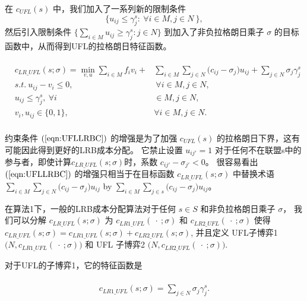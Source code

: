 \documentclass[UTF8]{article}
\begin{document}
\begin{定义}
      在 $c_{UFL}(s)$ 中，我们加入了一系列新的限制条件
      \begin{equation}\label{eqn:UFLLRBC}
      \big\{ u_{ij} \leq \gamma_j^s: ~\forall i \in M, j \in N\ \big\},
      \end{equation}
      然后引入限制条件 $\{ \sum_{i \in M} u_{ij} \geq \gamma_j^s:j \in N \}$ 到加入了非负拉格朗日乘子 $\sigma$ 的目标函数中，从而得到UFL的拉格朗日特征函数。

      \begin{eqnarray*}\label{eqn:LRPGCF}
      \begin{aligned}
      \begin{split}
      c_{LR\_UFL}(s;\sigma) = \min_{v,u} \sum_{i \in M} f_iv_i + &\sum_{i \in M} \sum_{j \in N} \big(c_{ij} - \sigma_{j}\big)u_{ij} + \sum_{j \in N} \sigma_j \gamma_j^s\\
      s.t.~u_{ij} - v_i \leq 0,&~\forall i \in M, j \in N,\\
      u_{ij} \leq \gamma_j^s,~\forall i& \in M, j \in N,\\
      v_i,u_{ij} \in \{0,1\},~&\forall i \in M, j \in N.
      \end{split}
      \end{aligned}
      \end{eqnarray*}

      约束条件 $(\ref{eqn:UFLLRBC})$ 的增强是为了加强 $c_{UFL}(s)$ 的拉格朗日下界，这有可能因此得到更好的LRB成本分配。
      它禁止设置 $u_{ij'}=1$ 对于任何不在联盟s中的参与者，即使计算$c_{LR\_UFL}(s;\sigma)$时，系数 $c_{ij'}- \sigma_{j'}<0$。
      很容易看出 $(\ref{eqn:UFLLRBC})$ 的增强只相当于在目标函数 $c_{LR\_UFL}(s;\sigma)$ 中替换术语 $\sum_{i \in M} \sum_{j \in N} \big(c_{ij} - \sigma_{j}\big)u_{ij}$ by $\sum_{i \in M} \sum_{j \in s} \big(c_{ij} - \sigma_{j}\big)u_{ij}$。

      在算法1下，一般的LRB成本分配算法对于任何 $s \in S$ 和非负拉格朗日乘子 $\sigma$， 我们可以分解 $c_{LR\_UFL}(s;\sigma)$ 为 $c_{LR1\_UFL}(\ \cdot \ ;\sigma)$ 和 $c_{LR2\_UFL}(\ \cdot \ ;\sigma)$ 使得 $c_{LR\_UFL}(s;\sigma) = c_{LR1\_UFL}(s;\sigma) + c_{LR2\_UFL}(s;\sigma)$, 并且定义 UFL子博弈1 $\big(N,c_{LR1\_UFL}(\ \cdot \ ;\sigma)\big)$ 和 UFL 子博弈2  $\big(N,c_{LR2\_UFL}(\ \cdot \ ;\sigma)\big)$.

      对于UFL的子博弈1，它的特征函数是

      \begin{eqnarray}\label{eqn:UFLCFsub1}
      \begin{aligned}
      \begin{split}
      c_{LR1\_UFL}(s;\sigma) = \sum_{j \in N} \sigma_j \gamma_j^s.
      \end{split}
      \end{aligned}
      \end{eqnarray}


\end{定义}
\end{document}
